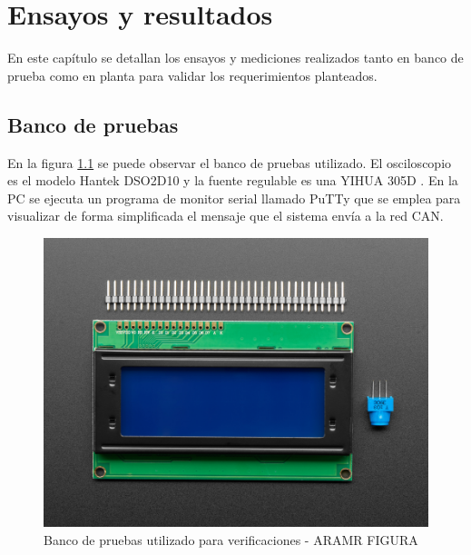 
\chapter{Ensayos y resultados} %

\label{Chapter4} %

En este capítulo se detallan los ensayos y mediciones realizados tanto en banco de prueba como en planta para validar los requerimientos planteados. 


\section{Banco de pruebas}

En la figura \ref{fig:Banco} se puede observar el banco de pruebas utilizado. El osciloscopio es el modelo Hantek DSO2D10 \citep{web_hantek} y la fuente regulable es una YIHUA 305D \citep{web_yihua}. En la PC se ejecuta un programa de monitor serial llamado PuTTy \citep{web_putty} que se emplea para visualizar de forma simplificada el mensaje que el sistema envía a la red CAN.

\begin{figure}[htbp]
	\centering
	\includegraphics[scale=1]{./Figures/LCD.jpg}
	\caption{Banco de pruebas utilizado para verificaciones - ARAMR FIGURA}
	\label{fig:Banco}
\end{figure}


